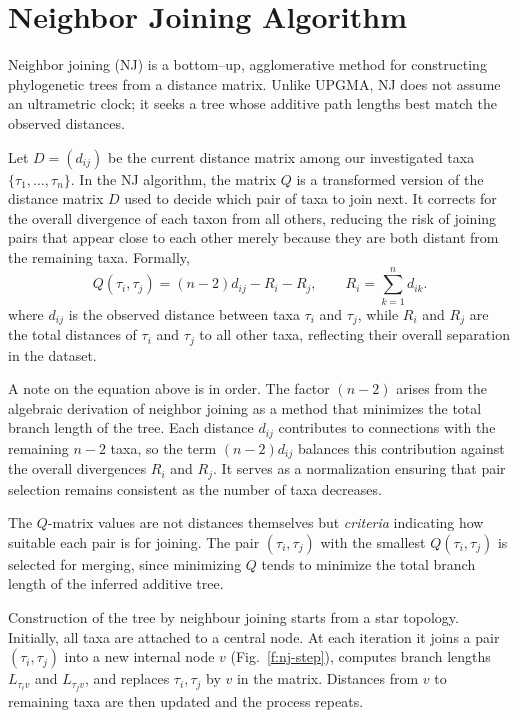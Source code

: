 \section{Neighbor Joining Algorithm}

Neighbor joining (NJ) is a bottom–up, agglomerative method for constructing phylogenetic trees from a distance matrix. Unlike UPGMA, NJ does not assume an ultrametric clock; it seeks a tree whose additive path lengths best match the observed distances.

Let $D=(d_{ij})$ be the current distance matrix among our investigated taxa $\{\tau_1,\dots,\tau_n\}$. In the NJ algorithm, the matrix $Q$ is a transformed version of the distance matrix $D$ used to decide which pair of taxa to join next.
It corrects for the overall divergence of each taxon from all others, reducing the risk of joining pairs that appear close to each other merely because they are both distant from the remaining taxa. Formally,
\[
Q(\tau_i,\tau_j) = (n-2)d_{ij} - R_i - R_j,
\qquad
R_i = \sum_{k=1}^{n} d_{ik}.
\]
where $d_{ij}$ is the observed distance between taxa $\tau_i$ and $\tau_j$, while $R_i$ and $R_j$ are the total distances of $\tau_i$ and $\tau_j$ to all other taxa, reflecting their overall separation in the dataset.

A note on the equation above is in order. The factor $(n-2)$ arises from the algebraic derivation of neighbor joining as a method that minimizes the total branch length of the tree. Each distance $d_{ij}$ contributes to connections with the remaining $n-2$ taxa, so the term $(n-2)d_{ij}$ balances this contribution against the overall divergences $R_i$ and $R_j$. It serves as a normalization ensuring that pair selection remains consistent as the number of taxa decreases.

The $Q$-matrix values are not distances themselves but \emph{criteria} indicating how suitable each pair is for joining. The pair $(\tau_i,\tau_j)$ with the smallest $Q(\tau_i,\tau_j)$ is selected for merging, since minimizing $Q$ tends to minimize the total branch length of the inferred additive tree.

Construction of the tree by neighbour joining starts from a star topology. Initially, all taxa are attached to a central node. At each iteration it joins a pair $(\tau_i,\tau_j)$ into a new internal node $v$ (Fig.~\ref{f:nj-step}), computes branch lengths $L_{\tau_i v}$ and $L_{\tau_j v}$, and replaces $\tau_i,\tau_j$ by $v$ in the matrix. Distances from $v$ to remaining taxa are then updated and the process repeats.

